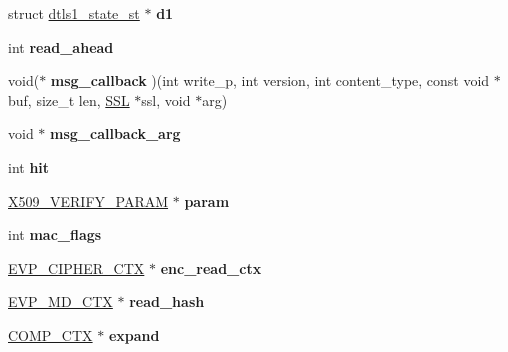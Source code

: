 \begin{DoxyCompactItemize}
\item 
\mbox{\label{structssl__st_afd70ab79ea0917b56fa74a8cb04ddaca}} 
struct \hyperlink{structdtls1__state__st}{dtls1\+\_\+state\+\_\+st} $\ast$ {\bfseries d1}
\item 
\mbox{\label{structssl__st_a6be4ea32cec16e0cfb2034f1d8fc3f37}} 
int {\bfseries read\+\_\+ahead}
\item 
\mbox{\label{structssl__st_a0b5f95998bc3a4a4193adeca3b7b289a}} 
void($\ast$ {\bfseries msg\+\_\+callback} )(int write\+\_\+p, int version, int content\+\_\+type, const void $\ast$buf, size\+\_\+t len, \hyperlink{structssl__st}{S\+SL} $\ast$ssl, void $\ast$arg)
\item 
\mbox{\label{structssl__st_a265c0d1adbd1e76b1b326a1f82b0cfcf}} 
void $\ast$ {\bfseries msg\+\_\+callback\+\_\+arg}
\item 
\mbox{\label{structssl__st_a20d2f2c7a00b1fd70c28c81c2d6f34c2}} 
int {\bfseries hit}
\item 
\mbox{\label{structssl__st_a384d0d3915209d3d4c8144146bab78aa}} 
\hyperlink{struct_x509___v_e_r_i_f_y___p_a_r_a_m__st}{X509\+\_\+\+V\+E\+R\+I\+F\+Y\+\_\+\+P\+A\+R\+AM} $\ast$ {\bfseries param}
\item 
\mbox{\label{structssl__st_a501b23b52ff9106b5cba654187324d95}} 
int {\bfseries mac\+\_\+flags}
\item 
\mbox{\label{structssl__st_ae2efb2324ed8b45b65cc2a3aa5ac1a4d}} 
\hyperlink{structevp__cipher__ctx__st}{E\+V\+P\+\_\+\+C\+I\+P\+H\+E\+R\+\_\+\+C\+TX} $\ast$ {\bfseries enc\+\_\+read\+\_\+ctx}
\item 
\mbox{\label{structssl__st_af550f07608665dad2b09a83c42ce494c}} 
\hyperlink{structenv__md__ctx__st}{E\+V\+P\+\_\+\+M\+D\+\_\+\+C\+TX} $\ast$ {\bfseries read\+\_\+hash}
\item 
\mbox{\label{structssl__st_a01fd32f00c26a995e998b0ad8edb38cf}} 
\hyperlink{structcomp__ctx__st}{C\+O\+M\+P\+\_\+\+C\+TX} $\ast$ {\bfseries expand}
\item 

\end{DoxyCompactItemize}
